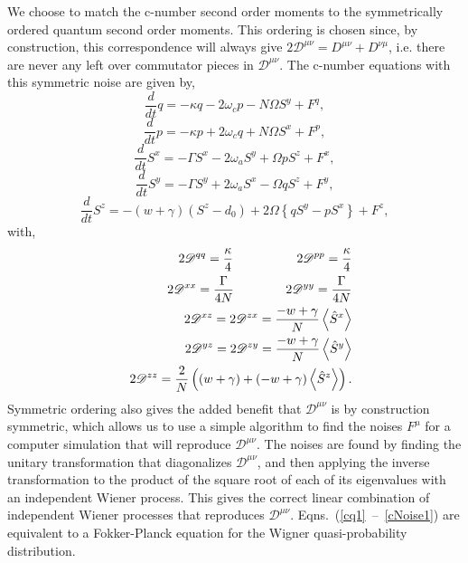 \documentclass[aps,prl,twocolumn,
superscriptaddress,groupedaddress]{revtex4}
\begin{document}
We choose to match the c-number second order moments to the
symmetrically ordered quantum second order moments. This ordering is
chosen since, by construction, this correspondence will always give
$2\mathscr{D}^{\mu \nu}=D^{\mu \nu}+D^{\nu \mu}$, i.e. there are never
any left over commutator pieces in $\mathscr{D}^{\mu \nu}$. The c-number
equations with this symmetric noise are given by,
\begin{equation}
\frac{d}{dt} q= -\kappa q - 2 \omega_c p - N \Omega S^{y} + F^{q},
\label{cq1}
\end{equation}
\begin{equation}
\frac{d}{dt} p= -\kappa p + 2 \omega_c q + N \Omega S^{x} + F^{p},
\end{equation}
\begin{equation}
\frac{d}{dt} S^{x} =
-\Gamma S^{x}  - 2 \omega_a S^{y} + \Omega p S^{z} + F^{x},
\end{equation}
\begin{equation}
\frac{d}{dt} S^{y} =
-\Gamma S^{y}  + 2 \omega_a S^{x} - \Omega q S^{z} + F^{y},
\end{equation}
\begin{equation}
\frac{d}{dt} S^{z} = -(w+\gamma)\left( S^{z} - d_0\right)
+2 \Omega \left\{ q S^{y} - p S^{x} \right\}
+F^{z},
\end{equation}
with,
\begin{eqnarray}
&& 2\mathscr{D}^{q q}=
\frac{\kappa}{4} \hspace{0.7in} 2\mathscr{D}^{p p}=
\frac{\kappa}{4} \nonumber \\
&& 2\mathscr{D}^{xx}=
\frac{\Gamma}{4N} \hspace{0.57in} 2\mathscr{D}^{yy}=
\frac{\Gamma}{4N} \nonumber \\
&& 2\mathscr{D}^{xz}=
2\mathscr{D}^{zx}=
\frac{-w+\gamma}{N} \left< \hat{S}^{x} \right>  \nonumber \\
&& 2\mathscr{D}^{yz}=
2\mathscr{D}^{zy}=
\frac{-w+\gamma}{N} \left< \hat{S}^{y} \right>  \nonumber \\
&& 2\mathscr{D}^{zz}=
\frac{2}{N}\left((w+\gamma) + (-w+\gamma)  \left< \hat{S}^{z} \right> \right).
\label{cNoise1}
\end{eqnarray}
Symmetric ordering also gives the added benefit that $\mathscr{D}^{\mu
\nu}$ is by construction symmetric, which allows us to use a simple
algorithm to find the noises $F^\mu$ for a computer simulation that will
reproduce $\mathscr{D}^{\mu \nu}$.  The noises are found by finding the
unitary transformation that diagonalizes $\mathscr{D}^{\mu \nu}$, and
then applying the inverse transformation to the product of the square
root of each of its eigenvalues with an independent Wiener process. This
gives the correct linear combination of independent Wiener processes
that reproduces $\mathscr{D}^{\mu \nu}$.
Eqns.~(\ref{cq1}~--~\ref{cNoise1}) are equivalent to a Fokker-Planck
equation for the Wigner quasi-probability distribution.
\end{document}
